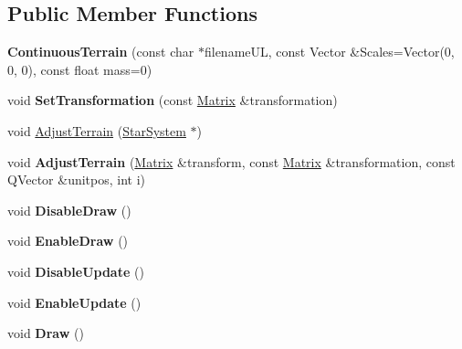 \subsection*{Public Member Functions}
\begin{DoxyCompactItemize}
\item 
{\bfseries Continuous\+Terrain} (const char $\ast$filename\+UL, const Vector \&Scales=Vector(0, 0, 0), const float mass=0)\hypertarget{classContinuousTerrain_a6b7b5e03f7833802ce6a00d19c1661be}{}\label{classContinuousTerrain_a6b7b5e03f7833802ce6a00d19c1661be}

\item 
void {\bfseries Set\+Transformation} (const \hyperlink{classMatrix}{Matrix} \&transformation)\hypertarget{classContinuousTerrain_a91910ffa8cb76ac130827ba49394f4fe}{}\label{classContinuousTerrain_a91910ffa8cb76ac130827ba49394f4fe}

\item 
void \hyperlink{classContinuousTerrain_a62d328b085bbc744966ebed9ea18c599}{Adjust\+Terrain} (\hyperlink{classStarSystem}{Star\+System} $\ast$)
\item 
void {\bfseries Adjust\+Terrain} (\hyperlink{classMatrix}{Matrix} \&transform, const \hyperlink{classMatrix}{Matrix} \&transformation, const Q\+Vector \&unitpos, int i)\hypertarget{classContinuousTerrain_ac87094d827b107b62b6a9de548c1c204}{}\label{classContinuousTerrain_ac87094d827b107b62b6a9de548c1c204}

\item 
void {\bfseries Disable\+Draw} ()\hypertarget{classContinuousTerrain_a6da3eb8f52b4b8b67c2ab653433f5298}{}\label{classContinuousTerrain_a6da3eb8f52b4b8b67c2ab653433f5298}

\item 
void {\bfseries Enable\+Draw} ()\hypertarget{classContinuousTerrain_a121ce24866e76cb80585ba2dbd8722e8}{}\label{classContinuousTerrain_a121ce24866e76cb80585ba2dbd8722e8}

\item 
void {\bfseries Disable\+Update} ()\hypertarget{classContinuousTerrain_a77d0a5f6211c6899be06c3dd1103d1b8}{}\label{classContinuousTerrain_a77d0a5f6211c6899be06c3dd1103d1b8}

\item 
void {\bfseries Enable\+Update} ()\hypertarget{classContinuousTerrain_afa4e086c0c5d75c14d034887d774843e}{}\label{classContinuousTerrain_afa4e086c0c5d75c14d034887d774843e}

\item 
void {\bfseries Draw} ()\hypertarget{classContinuousTerrain_a13b90d3ec94ea0fd20b543a72db7a5f8}{}\label{classContinuousTerrain_a13b90d3ec94ea0fd20b543a72db7a5f8}


\end{DoxyCompactItemize}
